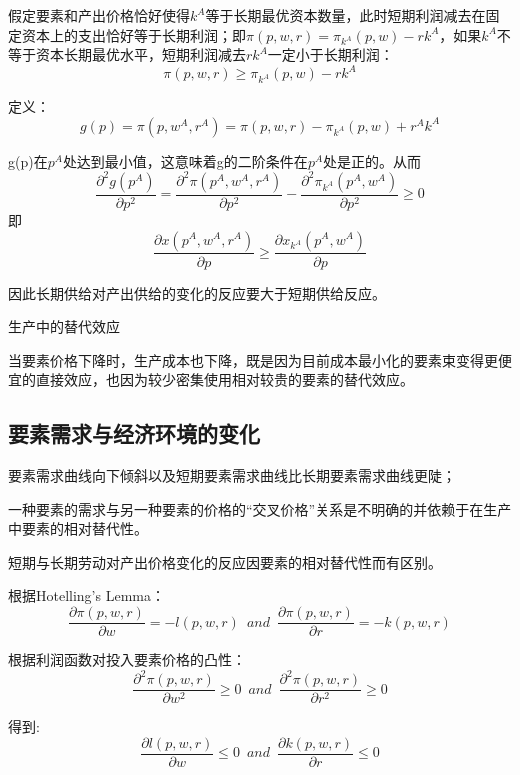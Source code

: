 \documentclass{article}
\begin{document}
假定要素和产出价格恰好使得$ k^A $等于长期最优资本数量，此时短期利润减去在固定资本上的支出恰好等于长期利润；即$ \pi(p,w,r)=\pi_{k^A}(p,w)-rk^A $，如果$ k^A $不等于资本长期最优水平，短期利润减去$ rk^A $一定小于长期利润：
\[
\pi(p,w,r)\ge\pi_{k^A}(p,w)-rk^A
\]

定义：
\[
g(p)=\pi(p,w^A,r^A)=\pi(p,w,r)-\pi_{k^A}(p,w)+r^Ak^A
\]

g(p)在$ p^A $处达到最小值，这意味着g的二阶条件在$ p^A $处是正的。从而
\[
\frac{\partial^2g(p^A)}{\partial p^2}=\frac{\partial^2\pi(p^A,w^A,r^A)}{\partial p^2}-\frac{\partial^2\pi_{k^A}(p^A,w^A)}{\partial p^2}\ge0
\]
即
\[
\frac{\partial x(p^A,w^A,r^A)}{\partial p}\ge\frac{\partial x_{k^A}(p^A,w^A)}{\partial p}
\]

因此长期供给对产出供给的变化的反应要大于短期供给反应。

\hspace*{\fill}

生产中的替代效应

当要素价格下降时，生产成本也下降，既是因为目前成本最小化的要素束变得更便宜的直接效应，也因为较少密集使用相对较贵的要素的替代效应。

\subsection{要素需求与经济环境的变化}

要素需求曲线向下倾斜以及短期要素需求曲线比长期要素需求曲线更陡；

一种要素的需求与另一种要素的价格的“交叉价格”关系是不明确的并依赖于在生产中要素的相对替代性。

短期与长期劳动对产出价格变化的反应因要素的相对替代性而有区别。

根据Hotelling's Lemma：
\[
\frac{\partial \pi(p,w,r)}{\partial w}=-l(p,w,r)\enspace and\enspace \frac{\partial \pi(p,w,r)}{\partial r}=-k(p,w,r)
\]

根据利润函数对投入要素价格的凸性：
\[
\frac{\partial^2 \pi(p,w,r)}{\partial w^2}\ge0\enspace and\enspace \frac{\partial^2 \pi(p,w,r)}{\partial r^2}\ge0
\]

得到:
\[
\frac{\partial l(p,w,r)}{\partial w}\le0\enspace and\enspace \frac{\partial k(p,w,r)}{\partial r}\le0
\]
\end{document}
